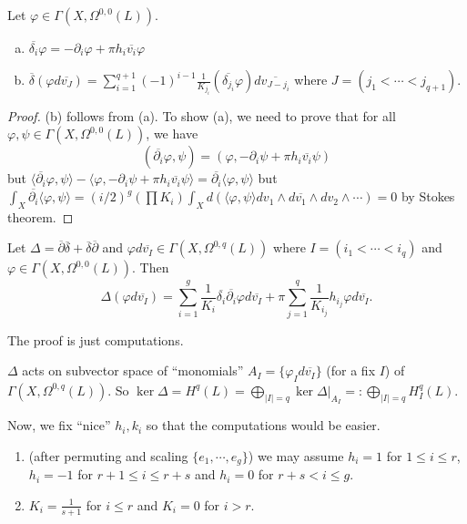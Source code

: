 \begin{lemma}
Let $\varphi\in \Gamma(X,\Omega^{0,0}(L))$.
\begin{enumerate}[(a)]
\item $\overline{\delta_i}\varphi=-\partial_i\varphi+\pi h_i \overline{v_i}\varphi$
\item $\overline{\delta}(\varphi d\overline{v_J})=\sum_{i=1}^{q+1}(-1)^{i-1}\frac{1}{K_{j_i}}(\overline{\delta_{j_i}}\varphi)d\overline{v_{J-j_i}}$ where $J=(j_1<\cdots <j_{q+1})$.
\end{enumerate}
\end{lemma}

\begin{proof}
(b) follows from (a). To show (a), we need to prove that for all $\varphi,\psi\in \Gamma(X,\Omega^{0,0}(L))$, we have
\[
(\overline{\partial_i}\varphi, \psi)=(\varphi, -\partial_i \psi +\pi h_i\overline{v_i}\psi)
\]
but $\langle \overline{\partial_i}\varphi,\psi\rangle-\langle \varphi, -\partial_i \psi +\pi h_i\overline{v_i}\psi\rangle=\overline{\partial_i}\langle \varphi,\psi\rangle$
but $\int_X \overline{\partial_i}\langle \varphi, \psi\rangle=(i/2)^g(\prod K_i)\int_X d(\langle \varphi, \psi\rangle dv_1\wedge d\overline{v_1}\wedge dv_2\wedge\cdots )=0$ by Stokes theorem. 
\end{proof} 
 
\begin{lemma}
Let $\Delta=\overline{\partial}\overline{\delta}+\overline{\delta}\overline{\partial}$ and $\varphi d\overline{v_I}\in \Gamma(X,\Omega^{0,q}(L))$ where $I=(i_1<\cdots <i_q)$ and $\varphi\in \Gamma(X,\Omega^{0,0}(L))$.
Then 
\[
\Delta(\varphi d\overline{v_I})=\sum_{i=1}^g \frac{1}{K_i}\overline{\delta_i}\overline{\partial_i}\varphi d\overline{v_I}+\pi \sum_{j=1}^q \frac{1}{K_{i_j}}h_{i_j}\varphi d\overline{v_I}.
\]
\end{lemma}
 
The proof is just computations. 

\begin{corollary}
$\Delta$ acts on subvector space of ``monomials'' $A_I=\{\varphi_Id\overline{v_I}\}$ (for a fix $I$) of $\Gamma(X,\Omega^{0,q}(L))$. So $\ker\Delta=H^q(L)=\bigoplus_{|I|=q}\ker\Delta|_{A_I}=:\bigoplus_{|I|=q}H_I^q(L)$. 
\end{corollary}

Now, we fix ``nice'' $h_i,k_i$ so that the computations would be easier.
\begin{enumerate}
\item (after permuting and scaling $\{e_1,\cdots,e_g\}$) we may assume $h_i=1$ for $1\leq i\leq r$, $h_i=-1$ for $r+1\leq i\leq r+s$ and $h_i=0$ for $r+s< i\leq g$. 
\item $K_i=\frac{1}{s+1}$ for $i\leq r$ and $K_i=0$ for $i>r$.
\end{enumerate}

